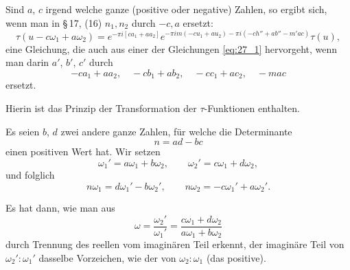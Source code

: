 \documentclass[12pt,a4paper]{article}
\begin{document}
Sind $a$, $c$ irgend welche ganze (positive oder negative) Zahlen, so ergibt sich, wenn man in \S\,17, (16) $n_1,n_2$ durch $-c,a$ ersetzt:
\begin{equation}\label{eq:27_3}
\tau(u-c\omega_1+a\omega_2) = e^{-\pi i[ca_1+aa_2]}e^{-\pi im(-cu_1+au_2)-\pi i(-ch''+ab''-m'ac)}\tau(u),
\end{equation}
eine Gleichung, die auch aus einer der Gleichungen \eqref{eq:27_1} hervorgeht, wenn man darin $a'$, $b'$, $c'$ durch
\[
-ca_1+aa_2,\quad -cb_1+ab_2,\quad -cc_1+ac_2,\quad -mac
\]
ersetzt.

Hierin ist das Prinzip der Transformation der $\tau$-Funktionen enthalten.

Es seien $b$, $d$ zwei andere ganze Zahlen, f\"ur welche die Determinante
\begin{equation}\label{eq:27_4}
n = ad-bc
\end{equation}
einen positiven Wert hat. Wir setzen
\begin{equation}\label{eq:27_5}
\omega_1' = a\omega_1+b\omega_2,\qquad \omega_2' = c\omega_1+d\omega_2,
\end{equation}
und folglich
\begin{equation}\label{eq:27_6}
n\omega_1 = d\omega_1'-b\omega_2',\qquad n\omega_2 = -c\omega_1'+a\omega_2'.
\end{equation}

\newpage
\noindent
Es hat dann, wie man aus
\[
\omega = \frac{\omega_2'}{\omega_1'} = \frac{c\omega_1+d\omega_2}{a\omega_1+b\omega_2}
\]
durch Trennung des reellen vom imagin\"aren Teil erkennt, der imagin\"are Teil von $\omega_2':\omega_1'$ dasselbe Vorzeichen, wie der von $\omega_2:\omega_1$ (das positive).
\end{document}
